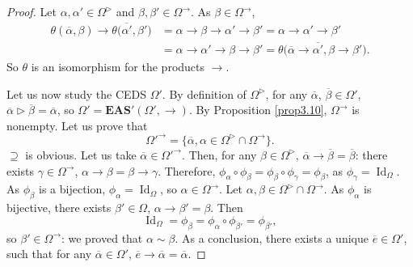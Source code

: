 \documentclass[pdftex]{sigma}
\numberwithin{equation}{section}
\newcommand{\eas}{\mathbf{EAS}}
\begin{document}
\begin{proof}
Let $\alpha,\alpha'\in \Omega^\triangleright$ and $\beta,\beta'\in \Omega^\rightarrow$. As $\beta\in \Omega^\rightarrow$,
\begin{align*}
\theta(\overline{\alpha},\beta)\rightarrow \theta\bigl(\overline{\alpha'},\beta'\bigr)&=\alpha \rightarrow \beta \rightarrow \alpha' \rightarrow \beta'=\alpha \rightarrow \alpha' \rightarrow \beta'\\
&=\alpha \rightarrow \alpha' \rightarrow \beta \rightarrow\beta'=\theta\bigl(\overline{\alpha}\rightarrow \overline{\alpha'},\beta \rightarrow \beta'\bigr).
\end{align*}
So $\theta$ is an isomorphism for the products $\rightarrow$.

Let us now study the CEDS $\Omega'$. By definition of $\Omega^\triangleright$, for any $\overline{\alpha}$, $\overline{\beta}\in \Omega'$, $\overline{\alpha}\triangleright \overline{\beta}=\overline{\alpha}$, so $\Omega'=\eas'(\Omega',\rightarrow)$.
By Proposition \ref{prop3.10}, $\Omega^\rightarrow$ is nonempty. Let us prove that
\[\Omega'^\rightarrow=\big\{\overline{\alpha}, \alpha\in \Omega^\triangleright\cap \Omega^\rightarrow\big\}.\]
$\supseteq$ is obvious. Let us take $\overline{\alpha}\in \Omega'^\rightarrow$. Then, for any $\beta \in \Omega^\triangleright$, $\overline{\alpha}\rightarrow\overline{\beta}=\overline{\beta}$:
there exists $\gamma \in \Omega^\rightarrow$, $\alpha \rightarrow \beta=\beta \rightarrow \gamma$. Therefore,
$\phi_\alpha\circ \phi_\beta=\phi_\beta \circ \phi_\gamma=\phi_\beta$,
as $\phi_\gamma=\operatorname{Id}_\Omega$. As $\phi_\beta$ is a bijection, $\phi_\alpha=\operatorname{Id}_\Omega$, so $\alpha \in \Omega^\rightarrow$. Let $\alpha,\beta \in \Omega^\triangleright\cap \Omega^\rightarrow$.
As $\phi_\alpha$ is bijective, there exists $\beta'\in \Omega$, $\alpha \rightarrow \beta'=\beta$. Then
\[ \operatorname{Id}_\Omega=\phi_\beta=\phi_\alpha\circ \phi_{\beta'}=\phi_{\beta'},\]
so $\beta'\in \Omega^\rightarrow$: we proved that $\alpha \sim \beta$. As a conclusion, there exists a unique $\overline{e}\in \Omega'$, such that for any $\overline{\alpha}\in \Omega'$, $\overline{e}\rightarrow \overline{\alpha}=\overline{\alpha}$.


\end{proof}
\end{document}
